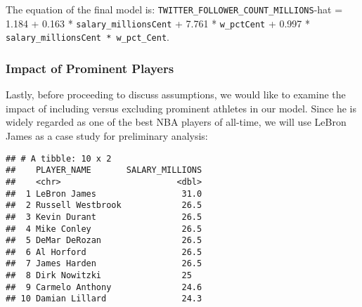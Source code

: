 \documentclass[]{article}
\newenvironment{Shaded}{\begin{snugshade}}{\end{snugshade}}
\newcommand{\DecValTok}[1]{\textcolor[rgb]{0.00,0.00,0.81}{#1}}
\newcommand{\KeywordTok}[1]{\textcolor[rgb]{0.13,0.29,0.53}{\textbf{#1}}}
\newcommand{\NormalTok}[1]{#1}
\newcommand{\OperatorTok}[1]{\textcolor[rgb]{0.81,0.36,0.00}{\textbf{#1}}}
\newcommand{\StringTok}[1]{\textcolor[rgb]{0.31,0.60,0.02}{#1}}
\begin{document}
The equation of the final model is:
\texttt{TWITTER\_FOLLOWER\_COUNT\_MILLIONS}-hat = 1.184 + 0.163 *
\texttt{salary\_millionsCent} + 7.761 * \texttt{w\_pctCent} + 0.997 *
\texttt{salary\_millionsCent\ *\ w\_pct\_Cent}.

\hypertarget{impact-of-prominent-players}{%
\subsubsection{Impact of Prominent
Players}\label{impact-of-prominent-players}}

Lastly, before proceeding to discuss assumptions, we would like to
examine the impact of including versus excluding prominent athletes in
our model. Since he is widely regarded as one of the best NBA players of
all-time, we will use LeBron James as a case study for preliminary
analysis:

\begin{Shaded}
\end{Shaded}

\begin{verbatim}
## # A tibble: 10 x 2
##    PLAYER_NAME       SALARY_MILLIONS
##    <chr>                       <dbl>
##  1 LeBron James                 31.0
##  2 Russell Westbrook            26.5
##  3 Kevin Durant                 26.5
##  4 Mike Conley                  26.5
##  5 DeMar DeRozan                26.5
##  6 Al Horford                   26.5
##  7 James Harden                 26.5
##  8 Dirk Nowitzki                25  
##  9 Carmelo Anthony              24.6
## 10 Damian Lillard               24.3
\end{verbatim}

\begin{Shaded}
\end{Shaded}
\end{document}
